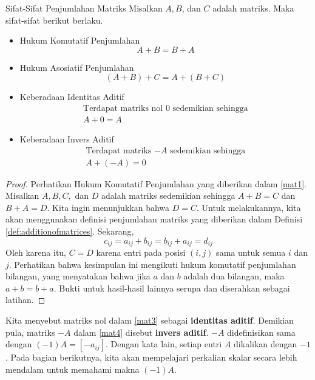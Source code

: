 \begin{proposition}{Sifat-Sifat Penjumlahan Matriks}\label{prop:propertiesofaddition}
Misalkan $A,B$, dan $C$ adalah matriks. Maka sifat-sifat berikut  berlaku. 

\begin{itemize}
\item Hukum Komutatif Penjumlahan
\begin{equation}
A+B=B+A  \label{mat1}
\end{equation}

\item Hukum Asosiatif Penjumlahan
\begin{equation}
\left( A+B\right) +C=A+\left( B+C\right) \label{mat2}
\end{equation}

\item Keberadaan Identitas Aditif
\begin{equation}
\begin{array}{c}
\mbox{Terdapat matriks nol 0 sedemikian sehingga}\\
A+0=A  \label{mat3}
\end{array}
\end{equation}

\item Keberadaan Invers Aditif
\begin{equation}
\begin{array}{c}
\mbox{Terdapat matriks $-A$ sedemikian sehingga} \\
A+\left( -A\right) =0 \label{mat4}
\end{array}
\end{equation}
\end{itemize}
\end{proposition}

\ifdefined\showproofs
\begin{proof}
Perhatikan Hukum Komutatif Penjumlahan yang diberikan dalam \ref{mat1}. Misalkan $A,B,C,$ dan $D$ adalah matriks sedemikian sehingga $A+B=C$ dan
$B+A=D.$ Kita ingin menunjukkan bahwa $D=C$. Untuk melakukannya, kita akan menggunakan definisi penjumlahan matriks yang diberikan dalam Definisi \ref{def:additionofmatrices}.
Sekarang,
\begin{equation*}
c_{ij}=a_{ij}+b_{ij}=b_{ij}+a_{ij}=d_{ij}
\end{equation*}
Oleh karena itu, $C=D$ karena entri pada posisi $(i,j)$ sama untuk semua $i$ dan $j$. Perhatikan bahwa
kesimpulan ini mengikuti hukum komutatif penjumlahan bilangan, yang menyatakan bahwa jika $a$ dan $b$ adalah dua bilangan,
maka $a+b = b+a$.
Bukti untuk hasil-hasil lainnya serupa dan diserahkan sebagai latihan.
\end{proof}
\fi

Kita menyebut matriks nol dalam \ref{mat3} sebagai \textbf{identitas aditif}. Demikian pula, matriks $-A$
dalam \ref{mat4} disebut \textbf{invers aditif}. $-A$
didefinisikan sama dengan $\left( -1\right) A = [-a_{ij}].$ Dengan kata lain, setiap entri $A$ dikalikan dengan $-1$.
Pada bagian berikutnya, kita akan mempelajari perkalian skalar secara lebih mendalam
untuk memahami makna $\left( -1\right) A.$
